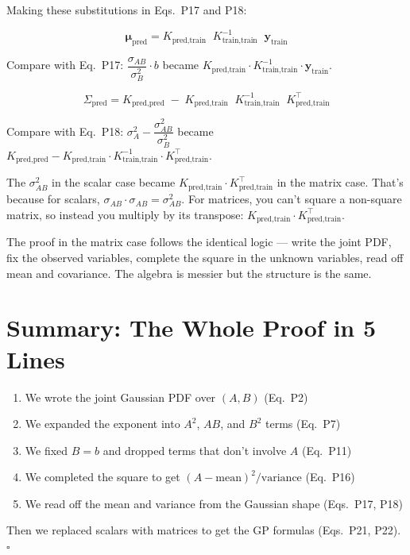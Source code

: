 \documentclass[11pt, a4paper]{article}
\newcommand{\gut}[1]{\begin{tcolorbox}[colback=lightyellow, colframe=orange!50, title=Gut feeling]#1\end{tcolorbox}}
\begin{document}
\bigskip
Making these substitutions in Eqs.~P17 and P18:

\begin{equation}
\boxed{\boldsymbol{\mu}_{\text{pred}} = K_{\text{pred,train}} \;\; K_{\text{train,train}}^{-1} \;\; \mathbf{y}_{\text{train}}}
\tag{P21}
\end{equation}

Compare with Eq.~P17: $\dfrac{\sigma_{AB}}{\sigma_B^2} \cdot b$ became $K_{\text{pred,train}} \cdot K_{\text{train,train}}^{-1} \cdot \mathbf{y}_{\text{train}}$.

\begin{equation}
\boxed{\Sigma_{\text{pred}} = K_{\text{pred,pred}} \;-\; K_{\text{pred,train}} \;\; K_{\text{train,train}}^{-1} \;\; K_{\text{pred,train}}^\top}
\tag{P22}
\end{equation}

Compare with Eq.~P18: $\sigma_A^2 - \dfrac{\sigma_{AB}^2}{\sigma_B^2}$ became $K_{\text{pred,pred}} - K_{\text{pred,train}} \cdot K_{\text{train,train}}^{-1} \cdot K_{\text{pred,train}}^\top$.

\gut{
The $\sigma_{AB}^2$ in the scalar case became $K_{\text{pred,train}} \cdot K_{\text{pred,train}}^\top$ in the matrix case. That's because for scalars, $\sigma_{AB} \cdot \sigma_{AB} = \sigma_{AB}^2$. For matrices, you can't square a non-square matrix, so instead you multiply by its transpose: $K_{\text{pred,train}} \cdot K_{\text{pred,train}}^\top$.
}

\bigskip
The proof in the matrix case follows the identical logic --- write the joint PDF, fix the observed variables, complete the square in the unknown variables, read off mean and covariance. The algebra is messier but the structure is the same.


\section*{\color{secblue}Summary: The Whole Proof in 5 Lines}

\begin{enumerate}
\item We wrote the joint Gaussian PDF over $(A, B)$ \hfill (Eq.~P2)
\item We expanded the exponent into $A^2$, $AB$, and $B^2$ terms \hfill (Eq.~P7)
\item We fixed $B = b$ and dropped terms that don't involve $A$ \hfill (Eq.~P11)
\item We completed the square to get $(A - \text{mean})^2 / \text{variance}$ \hfill (Eq.~P16)
\item We read off the mean and variance from the Gaussian shape \hfill (Eqs.~P17, P18)
\end{enumerate}

Then we replaced scalars with matrices to get the GP formulas (Eqs.~P21, P22). $\square$
\end{document}
